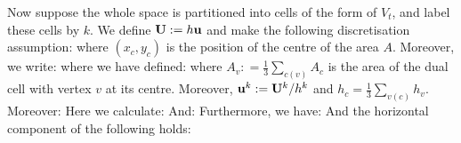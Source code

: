 \documentclass[10pt]{article}
\begin{document}
Now suppose the whole space is partitioned into cells of the form of $V_{t}$, and label these cells by $k$. We define $\mathbf{U} : = h\mathbf{u}$ and make the following discretisation assumption:
where $(x_{c},y_{c})$ is the position of the centre of the area $A$. Moreover, we write:
where we have defined:
where $A_{v} :  = \frac{1}{3}\sum_{c(v)} A_{c}$ is the area of the dual cell with vertex $v$ at its centre. Moreover, $\mathbf{u}^{k} : = \mathbf{U}^{k}/h^{k}$ and $h_{c} = \frac{1}{3}\sum_{v(c)} h_{v}$.\\
\linebreak
Moreover:
Here we calculate:
And:
Furthermore, we have:
And the horizontal component of the following holds:
\end{document}
